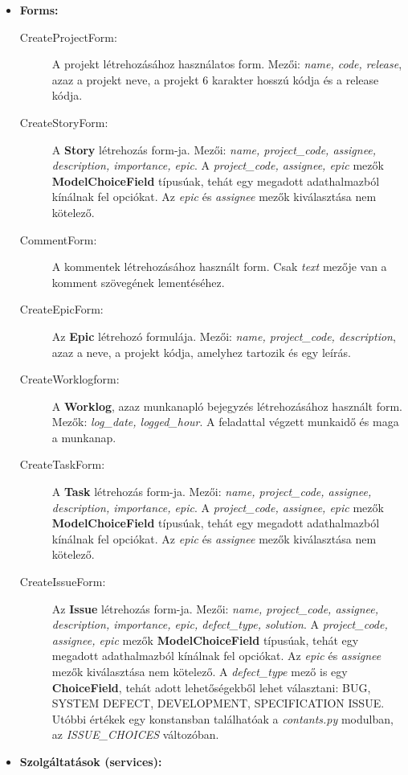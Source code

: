 \begin{itemize}
	\item \textbf{Forms:}
	\begin{description}
		\item[CreateProjectForm:] A projekt létrehozásához használatos form. Mezői: \textit{name, code, release}, azaz a projekt neve, a projekt 6 karakter hosszú kódja és a release kódja.
		\item[CreateStoryForm:] A \textbf{Story} létrehozás form-ja. Mezői: \textit{name, project\_code, assignee, description, importance, epic}. A \textit{project\_code, assignee, epic} mezők \textbf{ModelChoiceField} típusúak, tehát egy megadott adathalmazból kínálnak fel opciókat. Az \textit{epic} és \textit{assignee} mezők kiválasztása nem kötelező.
		\item[CommentForm:] A kommentek létrehozásához használt form. Csak \textit{text} mezője van a komment szövegének lementéséhez.
		\item[CreateEpicForm:] Az \textbf{Epic} létrehozó formulája. Mezői: \textit{name, project\_code, description}, azaz a neve, a projekt kódja, amelyhez tartozik és egy leírás.
		\item[CreateWorklogform:] A \textbf{Worklog}, azaz munkanapló bejegyzés létrehozásához használt form. Mezők: \textit{log\_date, logged\_hour}. A feladattal végzett munkaidő és maga a munkanap.
		\item[CreateTaskForm:]  A \textbf{Task} létrehozás form-ja. Mezői: \textit{name, project\_code, assignee, description, importance, epic}. A \textit{project\_code, assignee, epic} mezők \textbf{ModelChoiceField} típusúak, tehát egy megadott adathalmazból kínálnak fel opciókat. Az \textit{epic} és \textit{assignee} mezők kiválasztása nem kötelező.
		\item[CreateIssueForm:] Az \textbf{Issue} létrehozás form-ja. Mezői: \textit{name, project\_code, assignee, description, importance, epic, defect\_type, solution}. A \textit{project\_code, assignee, epic} mezők \textbf{ModelChoiceField} típusúak, tehát egy megadott adathalmazból kínálnak fel opciókat. Az \textit{epic} és \textit{assignee} mezők kiválasztása nem kötelező. A \textit{defect\_type} mező is egy \textbf{ChoiceField}, tehát adott lehetőségekből lehet választani: BUG, SYSTEM DEFECT, DEVELOPMENT, SPECIFICATION ISSUE. Utóbbi értékek egy konstansban találhatóak a \textit{contants.py} modulban, az \textit{ISSUE\_CHOICES} változóban.
	\end{description}
	\item \textbf{Szolgáltatások (services):}

\end{itemize}
